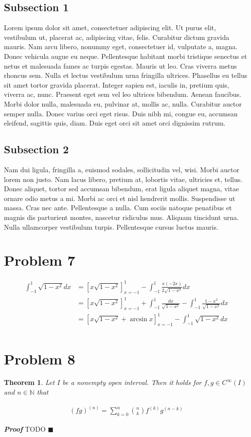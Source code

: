 \documentclass[12pt]{article}
\newtheorem{theorem}{Theorem}
\newenvironment{proof}{\textit{\textbf{Proof}}}{\hfill$\blacksquare$}
\begin{document}
\subsection{Subsection 1}
Lorem ipsum dolor sit amet, consectetuer
adipiscing elit. Ut purus elit, vestibulum ut, placerat ac,
adipiscing vitae, felis. Curabitur dictum gravida mauris. Nam arcu
libero, nonummy eget, consectetuer id, vulputate a, magna. Donec
vehicula augue eu neque. Pellentesque habitant morbi tristique
senectus et netus et malesuada fames ac turpis egestas. Mauris ut
leo. Cras viverra metus rhoncus sem. Nulla et lectus vestibulum urna
fringilla ultrices.  Phasellus eu tellus sit amet tortor gravida
placerat. Integer sapien est, iaculis in, pretium quis, viverra ac,
nunc. Praesent eget sem vel leo ultrices bibendum. Aenean faucibus.
Morbi dolor nulla, malesuada eu, pulvinar at, mollis ac, nulla.
Curabitur auctor semper nulla. Donec varius orci eget risus. Duis
nibh mi, congue eu, accumsan eleifend, sagittis quis, diam. Duis
eget orci sit amet orci dignissim rutrum.
\newpage

\subsection{Subsection 2}
Nam dui ligula, fringilla a, euismod sodales,
sollicitudin vel, wisi. Morbi auctor lorem non justo. Nam lacus
libero, pretium at, lobortis vitae, ultricies et, tellus. Donec
aliquet, tortor sed accumsan bibendum, erat ligula aliquet magna,
vitae ornare odio metus a mi. Morbi ac orci et nisl hendrerit
mollis. Suspendisse ut massa. Cras nec ante. Pellentesque a nulla.
Cum sociis natoque penatibus et magnis dis parturient montes,
nascetur ridiculus mus. Aliquam tincidunt urna. Nulla ullamcorper
vestibulum turpis. Pellentesque cursus luctus mauris.

\section{Problem 7}
\begin{align*}
	\int_{-1}^{1}\sqrt{1-x^2}dx &= \left[x\sqrt{1-x^2} \right]_{x=-1}^{1} - \int_{-1}^{1}\frac{x(-2x)}{2\sqrt{1-x^2}}dx \\
	&= \left[x\sqrt{1-x^2} \right]_{x=-1}^{1} + \int_{-1}^{1}\frac{dx}{\sqrt{1-x^2}} - \int_{-1}^{1}\frac{1-x^2}{\sqrt{1-x^2}}dx \\
	&= \left[x\sqrt{1-x^2} + \arcsin x \right]_{x=-1}^{1} - \int_{-1}^{1}\sqrt{1-x^2}dx \\
\end{align*}

\section{Problem 8}
\begin{theorem}
	Let $I$ be a nonempty open interval. Then it holds for $f, g \in C^\infty(I)$ and $n \in \mathbb{N}$ that
	
	\begin{align*}
		(fg)^{(n)} = \sum_{k=0}^{n}\binom{n}{k} f^{(k)}g^{(n-k)}
	\end{align*}
\end{theorem}

\begin{proof}
	TODO
\end{proof}

\printindex
\end{document}

